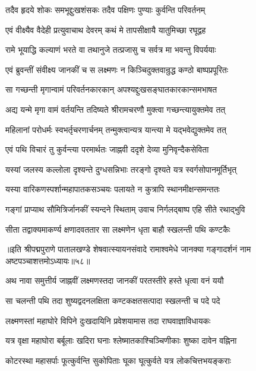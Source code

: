 \twolineshloka
{तदैव हृदये शोकः समभूद्दुःखशंसकः}
{तदैव पक्षिणः पुण्याः कुर्वन्ति परिवर्तनम्}%

\twolineshloka
{एवं वीक्ष्यैव वैदेही प्रत्युवाचाथ देवरम्}
{कथं मे तापसीक्षायै यातुमिच्छा रघूद्वह}%

\twolineshloka
{रामे भूयाद्धि कल्याणं भरते वा तथानुजे}
{तत्प्रजासु च सर्वत्र मा भवन्तु विपर्ययाः}%

\twolineshloka
{एवं ब्रुवन्तीं संवीक्ष्य जानकीं च स लक्ष्मणः}
{न किञ्चिदुक्तवान्रुद्ध कण्ठो बाष्पप्रपूरितः}%

\twolineshloka
{सा गच्छन्ती मृगान्वामं परिवर्तनकारकान्}
{अपश्यद्दुःखसङ्घातकारकान्समभाषत}%

\twolineshloka
{अद्य यन्मे मृगा वामं वर्तयन्ति तदिष्यते}
{श्रीरामचरणौ मुक्त्वा गच्छन्त्यायुक्तमेव तत्}%

\twolineshloka
{महिलानां परोधर्मः स्वभर्तृचरणार्चनम्}
{तन्मुक्त्वान्यत्र यान्त्या मे यद्भवेद्युक्तमेव तत्}%

\twolineshloka
{एवं पथि विचारं तु कुर्वन्त्या परमार्थतः}
{जाह्नवी ददृशे देव्या मुनिवृन्दैकसेविता}%

\twolineshloka
{यस्यां जलस्य कल्लोला दृश्यन्ते दुग्धसन्निभाः}
{तरङ्गो दृश्यते यत्र स्वर्गसोपानमूर्तिभृत्}%

\twolineshloka
{यस्या वारिकणस्पर्शान्महापातकसञ्चयः}
{पलायते न कुत्रापि स्थानमीक्षन्समन्ततः}%

\twolineshloka
{गङ्गां प्राप्याथ सौमित्रिर्जानकीं स्यन्दने स्थिताम्}
{उवाच निर्गलद्बाष्प एहि सीते रथाद्भुवि}%

\twolineshloka
{सीता तद्वाक्यमाकर्ण्य क्षणादवततार सा}
{लक्ष्मणेन धृता बाहौ स्खलन्ती पथि कण्टकैः}%

{॥इति श्रीपद्मपुराणे पातालखण्डे शेषवात्स्यायनसंवादे रामाश्वमेधे जानक्या गङ्गादर्शनं नाम अष्टपञ्चाशत्तमोऽध्यायः॥५८॥}



\twolineshloka
{अथ नावा समुत्तीर्य जाह्नवीं लक्ष्मणस्तदा}
{जानकीं परतस्तीरे हस्ते धृत्वा वनं ययौ}%

\twolineshloka
{सा चलन्ती पथि तदा शुष्यद्वदनलक्षिता}
{कण्टकक्षतसत्पादा स्खलन्ती च पदे पदे}%

\twolineshloka
{लक्ष्मणस्तां महाघोरे विपिने दुःखदायिनि}
{प्रवेशयामास तदा राघवाज्ञाविधायकः}%

\twolineshloka
{यत्र वृक्षा महाघोरा बर्बूलाः खदिरा घनाः}
{श्लेष्मातकाश्चिञ्चिणीकाः शुष्का दावेन वह्निना}%

\twolineshloka
{कोटरस्था महासर्पाः फूत्कुर्वन्ति सुकोपिताः}
{घूका घूत्कुर्वते यत्र लोकचित्तभयङ्कराः}%

